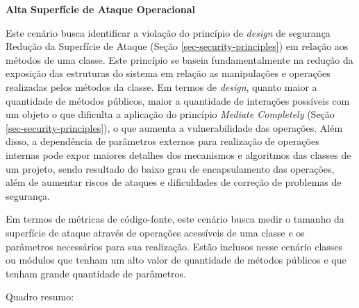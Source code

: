 %

\textbf{Alta Superfície de Ataque Operacional}

%

Este cenário busca identificar a violação do princípio de \emph{design} de segurança Redução da Superfície de Ataque (Seção \ref{sec-security-principles}) em relação aos métodos de uma classe. Este princípio se baseia fundamentalmente na redução da exposição das estruturas do sistema em relação as manipulações e operações realizadas pelos métodos da classe. Em termos de \emph{design}, quanto maior a quantidade de métodos públicos, maior a quantidade de interações possíveis com um objeto o que dificulta a aplicação do princípio \emph{Mediate Completely} (Seção \ref{sec-security-principles}), o que aumenta a vulnerabilidade das operações. Além disso, a dependência de parâmetros externos para realização de operações internas pode expor maiores detalhes dos mecanismos e algoritmos das classes de um projeto, sendo resultado do baixo grau de encapsulamento das operações, além de aumentar riscos de ataques e dificuldades de correção de problemas de segurança. 

%

Em termos de métricas de código-fonte, este cenário busca medir o tamanho da superfície de ataque através de operações acessíveis de uma classe e os parâmetros necessários para sua realização. Estão inclusos nesse cenário classes ou módulos que tenham um alto valor de quantidade de métodos públicos e que tenham grande quantidade de parâmetros. 

%

Quadro resumo:

